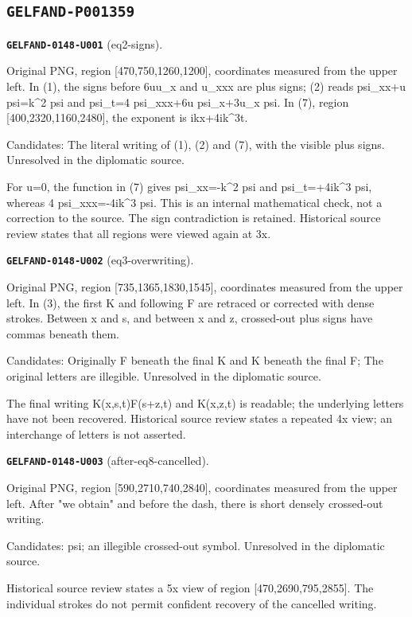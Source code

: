 \documentclass[11pt]{article}
\theoremstyle{definition}
\theoremstyle{remark}
\begin{document}
\subsection*{\texttt{GELFAND-P001359}}
\noindent\leavevmode{}\label{GELFAND-P001359:eq2-signs:note}\textbf{\texttt{GELFAND-0148-U001}} (eq2-signs).\par\nopagebreak[4]
Original PNG, region [470,750,1260,1200], coordinates measured from the upper left. In (1), the signs before 6uu\_x and u\_xxx are plus signs; (2) reads psi\_xx+u psi=k\textasciicircum{}2 psi and psi\_t=4 psi\_xxx+6u psi\_x+3u\_x psi. In (7), region [400,2320,1160,2480], the exponent is ikx+4ik\textasciicircum{}3t.\par
Candidates: The literal writing of (1), (2) and (7), with the visible plus signs. Unresolved in the diplomatic source.\par
For u=0, the function in (7) gives psi\_xx=-k\textasciicircum{}2 psi and psi\_t=+4ik\textasciicircum{}3 psi, whereas 4 psi\_xxx=-4ik\textasciicircum{}3 psi. This is an internal mathematical check, not a correction to the source. The sign contradiction is retained. Historical source review states that all regions were viewed again at 3x.\par\medskip
\noindent\leavevmode{}\label{GELFAND-P001359:eq3-overwriting:note}\textbf{\texttt{GELFAND-0148-U002}} (eq3-overwriting).\par\nopagebreak[4]
Original PNG, region [735,1365,1830,1545], coordinates measured from the upper left. In (3), the first K and following F are retraced or corrected with dense strokes. Between x and s, and between x and z, crossed-out plus signs have commas beneath them.\par
Candidates: Originally F beneath the final K and K beneath the final F; The original letters are illegible. Unresolved in the diplomatic source.\par
The final writing K(x,s,t)F(s+z,t) and K(x,z,t) is readable; the underlying letters have not been recovered. Historical source review states a repeated 4x view; an interchange of letters is not asserted.\par\medskip
\noindent\leavevmode{}\label{GELFAND-P001359:after-eq8-cancelled:note}\textbf{\texttt{GELFAND-0148-U003}} (after-eq8-cancelled).\par\nopagebreak[4]
Original PNG, region [590,2710,740,2840], coordinates measured from the upper left. After "we obtain" and before the dash, there is short densely crossed-out writing.\par
Candidates: psi; an illegible crossed-out symbol. Unresolved in the diplomatic source.\par
Historical source review states a 5x view of region [470,2690,795,2855]. The individual strokes do not permit confident recovery of the cancelled writing.\par\medskip
\end{document}
